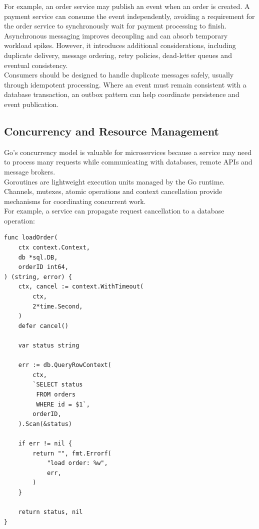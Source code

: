 For example, an order service may publish an event when an order is created. A payment service can consume the event independently, avoiding a requirement for the order service to synchronously wait for payment processing to finish.\\

Asynchronous messaging improves decoupling and can absorb temporary workload spikes. However, it introduces additional considerations, including duplicate delivery, message ordering, retry policies, dead-letter queues and eventual consistency.\\

Consumers should be designed to handle duplicate messages safely, usually through idempotent processing. Where an event must remain consistent with a database transaction, an outbox pattern can help coordinate persistence and event publication.

\subsection{Concurrency and Resource Management}

Go's concurrency model is valuable for microservices because a service may need to process many requests while communicating with databases, remote APIs and message brokers.\\

Goroutines are lightweight execution units managed by the Go runtime. Channels, mutexes, atomic operations and context cancellation provide mechanisms for coordinating concurrent work.\\

For example, a service can propagate request cancellation to a database operation:

\begin{lstlisting}
func loadOrder(
    ctx context.Context,
    db *sql.DB,
    orderID int64,
) (string, error) {
    ctx, cancel := context.WithTimeout(
        ctx,
        2*time.Second,
    )
    defer cancel()

    var status string

    err := db.QueryRowContext(
        ctx,
        `SELECT status
         FROM orders
         WHERE id = $1`,
        orderID,
    ).Scan(&status)

    if err != nil {
        return "", fmt.Errorf(
            "load order: %w",
            err,
        )
    }

    return status, nil
}
\end{lstlisting}

